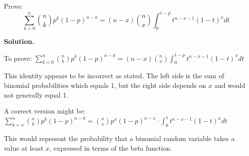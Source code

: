 \begin{problembox}
Prove:
\[ \sum_{k=0}^n \binom{n}{k}p^k(1-p)^{n-k} = (n-x)\binom{n}{x}\int_0^{1-p} t^{n-x-1}(1-t)^x dt \]
\end{problembox}

\noindent\textbf{Solution.}

To prove: $\sum_{k=0}^n \binom{n}{k}p^k(1-p)^{n-k} = (n-x)\binom{n}{x}\int_0^{1-p} t^{n-x-1}(1-t)^x dt$

This identity appears to be incorrect as stated. The left side is the sum of binomial probabilities which equals 1, but the right side depends on $x$ and would not generally equal 1.

A correct version might be:
$\sum_{k=x}^n \binom{n}{k}p^k(1-p)^{n-k} = \binom{n}{x}p^x(1-p)^{n-x} \cdot \int_0^1 t^{n-x-1}(1-t)^x dt$

This would represent the probability that a binomial random variable takes a value at least $x$, expressed in terms of the beta function.
